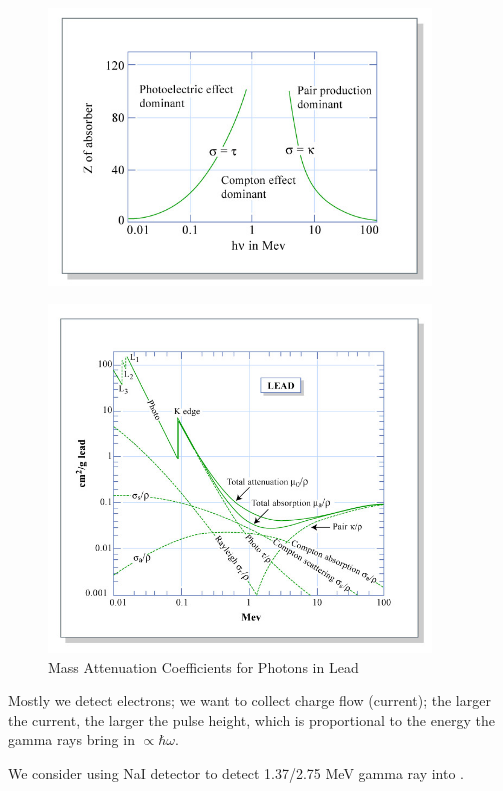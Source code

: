 \documentclass{school-22.101-notes}
\begin{document}
  \begin{figure}[ht]
    \centering
    \includegraphics[width=4in]{images/ni/18.10.png}
    \caption{} \label{18.10} 
  \end{figure}

  \begin{figure}[ht]
    \centering
    \includegraphics[width=4in]{images/ni/18.13.png}
    \caption{Mass Attenuation Coefficients for Photons in Lead} \label{18.13} 
  \end{figure}


Mostly we detect electrons; we want to collect charge flow (current); the larger the current, the larger the pulse height, which is proportional to the energy the gamma rays bring in $\propto \hbar \omega$.

We consider using NaI detector to detect 1.37/2.75 MeV gamma ray into . 
\end{document}
